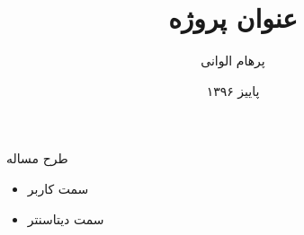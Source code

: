 \documentclass{beamer}
\title{
	عنوان پروژه
}
\subtitle{}
\author{پرهام الوانی}
\institute{دانشکده مهندسی کامپیوتر و فناوری اطلاعات}
\date{پاییز ۱۳۹۶}
\makeatletter
\newcommand{\RTList}{\raggedleft\rightskip\@totalleftmargin}
\makeatother
\begin{document}
\begin{persian}
\begin{frame}
\maketitle
\end{frame}

\everypar{\rightskip\rightmargin}
\begin{frame}{طرح مساله}
	\begin{itemize}\RTList
		\item سمت کاربر
		\item سمت دیتاسنتر
	\end{itemize}
\end{frame}

\end{persian}
\end{document}
